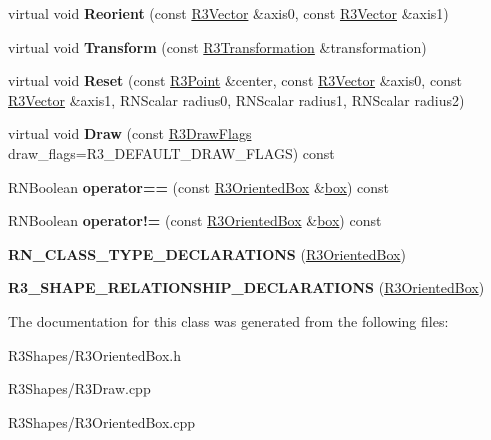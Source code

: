 \begin{DoxyCompactItemize}
\item 
virtual void {\bfseries Reorient} (const \hyperlink{class_r3_vector}{R3\+Vector} \&axis0, const \hyperlink{class_r3_vector}{R3\+Vector} \&axis1)\hypertarget{class_r3_oriented_box_a5692cc0b0fcace1d1e66b4df479a3d4a}{}\label{class_r3_oriented_box_a5692cc0b0fcace1d1e66b4df479a3d4a}

\item 
virtual void {\bfseries Transform} (const \hyperlink{class_r3_transformation}{R3\+Transformation} \&transformation)\hypertarget{class_r3_oriented_box_a84c3e78dd9dc204ff0627aa584e5eddf}{}\label{class_r3_oriented_box_a84c3e78dd9dc204ff0627aa584e5eddf}

\item 
virtual void {\bfseries Reset} (const \hyperlink{class_r3_point}{R3\+Point} \&center, const \hyperlink{class_r3_vector}{R3\+Vector} \&axis0, const \hyperlink{class_r3_vector}{R3\+Vector} \&axis1, R\+N\+Scalar radius0, R\+N\+Scalar radius1, R\+N\+Scalar radius2)\hypertarget{class_r3_oriented_box_aa52e70fbfd3589223610ddcfa4c1313b}{}\label{class_r3_oriented_box_aa52e70fbfd3589223610ddcfa4c1313b}

\item 
virtual void {\bfseries Draw} (const \hyperlink{class_r_n_flags}{R3\+Draw\+Flags} draw\+\_\+flags=R3\+\_\+\+D\+E\+F\+A\+U\+L\+T\+\_\+\+D\+R\+A\+W\+\_\+\+F\+L\+A\+GS) const \hypertarget{class_r3_oriented_box_a3ab43dc67d7dd7bf6aa58bdca2c9f343}{}\label{class_r3_oriented_box_a3ab43dc67d7dd7bf6aa58bdca2c9f343}

\item 
R\+N\+Boolean {\bfseries operator==} (const \hyperlink{class_r3_oriented_box}{R3\+Oriented\+Box} \&\hyperlink{structbox}{box}) const \hypertarget{class_r3_oriented_box_ae136893a8dd4b75314483e164b3eb6d9}{}\label{class_r3_oriented_box_ae136893a8dd4b75314483e164b3eb6d9}

\item 
R\+N\+Boolean {\bfseries operator!=} (const \hyperlink{class_r3_oriented_box}{R3\+Oriented\+Box} \&\hyperlink{structbox}{box}) const \hypertarget{class_r3_oriented_box_a32a4bc55b2b0d5eb7bdc043ea9adf9de}{}\label{class_r3_oriented_box_a32a4bc55b2b0d5eb7bdc043ea9adf9de}

\item 
{\bfseries R\+N\+\_\+\+C\+L\+A\+S\+S\+\_\+\+T\+Y\+P\+E\+\_\+\+D\+E\+C\+L\+A\+R\+A\+T\+I\+O\+NS} (\hyperlink{class_r3_oriented_box}{R3\+Oriented\+Box})\hypertarget{class_r3_oriented_box_a4b3849e36f419171a90522b8867a5f71}{}\label{class_r3_oriented_box_a4b3849e36f419171a90522b8867a5f71}

\item 
{\bfseries R3\+\_\+\+S\+H\+A\+P\+E\+\_\+\+R\+E\+L\+A\+T\+I\+O\+N\+S\+H\+I\+P\+\_\+\+D\+E\+C\+L\+A\+R\+A\+T\+I\+O\+NS} (\hyperlink{class_r3_oriented_box}{R3\+Oriented\+Box})\hypertarget{class_r3_oriented_box_ad47428562a81d39534ef559e21f441f3}{}\label{class_r3_oriented_box_ad47428562a81d39534ef559e21f441f3}

\end{DoxyCompactItemize}


The documentation for this class was generated from the following files\+:\begin{DoxyCompactItemize}
\item 
R3\+Shapes/R3\+Oriented\+Box.\+h\item 
R3\+Shapes/R3\+Draw.\+cpp\item 
R3\+Shapes/R3\+Oriented\+Box.\+cpp\end{DoxyCompactItemize}
